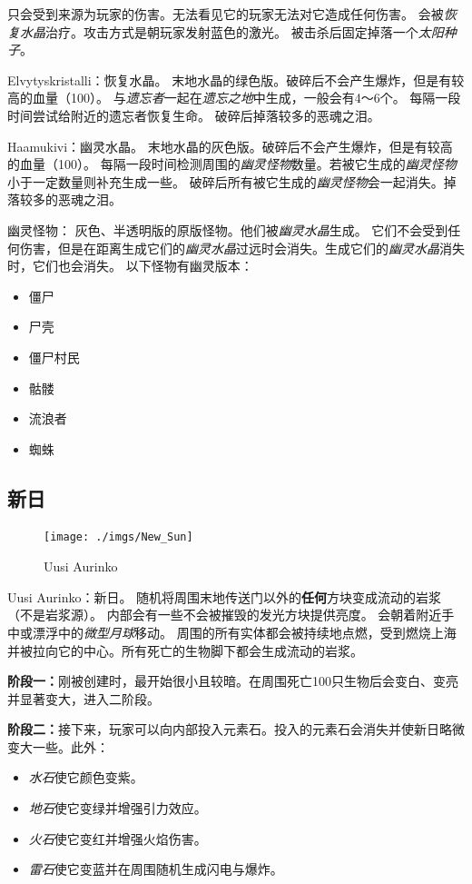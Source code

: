 \documentclass[11pt]{article}
\begin{document}
    只会受到来源为玩家的伤害。无法看见它的玩家无法对它造成任何伤害。
    会被\textit{恢复水晶}治疗。攻击方式是朝玩家发射蓝色的激光。
    被击杀后固定掉落一个\textit{太阳种子}。

    Elvytyskristalli：恢复水晶。
    末地水晶的绿色版。破碎后不会产生爆炸，但是有较高的血量（100）。
    与\textit{遗忘者}一起在\textit{遗忘之地}中生成，一般会有4～6个。
    每隔一段时间尝试给附近的遗忘者恢复生命。
    破碎后掉落较多的恶魂之泪。

    Haamukivi：幽灵水晶。
    末地水晶的灰色版。破碎后不会产生爆炸，但是有较高的血量（100）。
    每隔一段时间检测周围的\textit{幽灵怪物}数量。若被它生成的\textit{幽灵怪物}小于一定数量则补充生成一些。
    破碎后所有被它生成的\textit{幽灵怪物}会一起消失。掉落较多的恶魂之泪。

    幽灵怪物：
    灰色、半透明版的原版怪物。他们被\textit{幽灵水晶}生成。
    它们不会受到任何伤害，但是在距离生成它们的\textit{幽灵水晶}过远时会消失。生成它们的\textit{幽灵水晶}消失时，它们也会消失。
    以下怪物有幽灵版本：
    \begin{itemize}
        \item 僵尸
        \item 尸壳
        \item 僵尸村民
        \item 骷髅
        \item 流浪者
        \item 蜘蛛
    \end{itemize}

    \subsection{新日}\label{subsec:new-sun}
    \begin{figure}[ht]
        \texttt{[image: ./imgs/New\_Sun]}
        \caption{Uusi Aurinko}\label{fig:new-sun}
    \end{figure}
    Uusi Aurinko：新日。
    随机将周围末地传送门以外的\textbf{任何}方块变成流动的岩浆（不是岩浆源）。
    内部会有一些不会被摧毁的发光方块提供亮度。
    会朝着附近手中或漂浮中的\textit{微型月球}移动。
    周围的所有实体都会被持续地点燃，受到燃烧上海并被拉向它的中心。所有死亡的生物脚下都会生成流动的岩浆。

    \textbf{阶段一：}刚被创建时，最开始很小且较暗。在周围死亡100只生物后会变白、变亮并显著变大，进入二阶段。

    \textbf{阶段二：}接下来，玩家可以向内部投入元素石。投入的元素石会消失并使新日略微变大一些。此外：
    \begin{itemize}
        \item \textit{水石}使它颜色变紫。
        \item \textit{地石}使它变绿并增强引力效应。
        \item \textit{火石}使它变红并增强火焰伤害。
        \item \textit{雷石}使它变蓝并在周围随机生成闪电与爆炸。
    \end{itemize}
\end{document}
